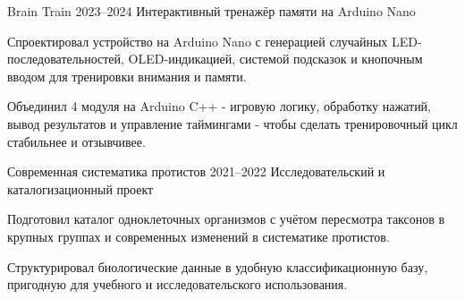 \documentclass[10pt,a4paper]{article}
\begin{document}
{\begin{minipage}[t][\pagecontentheight]{\mainwidth}
\begin{minipage}[t][\maininnerheight]{\maininnerwidth}
    \MainEntry
      {Brain Train}
      {2023--2024}
      {Интерактивный тренажёр памяти на Arduino Nano}
      {}
      {\begin{mainbullets}
        \item Спроектировал устройство на Arduino Nano с генерацией случайных LED-последовательностей, OLED-индикацией, системой подсказок и кнопочным вводом для тренировки внимания и памяти.
        \item Объединил 4 модуля на Arduino C++ - игровую логику, обработку нажатий, вывод результатов и управление таймингами - чтобы сделать тренировочный цикл стабильнее и отзывчивее.
      \end{mainbullets}}

    \MainEntry
      {Современная систематика протистов}
      {2021--2022}
      {Исследовательский и каталогизационный проект}
      {}
      {\begin{mainbullets}
        \item Подготовил каталог одноклеточных организмов с учётом пересмотра таксонов в крупных группах и современных изменений в систематике протистов.
        \item Структурировал биологические данные в удобную классификационную базу, пригодную для учебного и исследовательского использования.
      \end{mainbullets}}

    \RightFooter{}
  \end{minipage}
\end{minipage}}
\end{document}

